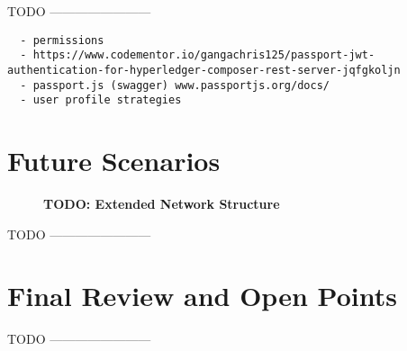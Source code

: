 TODO ------------------------

\begin{verbatim}
  - permissions
  - https://www.codementor.io/gangachris125/passport-jwt-authentication-for-hyperledger-composer-rest-server-jqfgkoljn
  - passport.js (swagger) www.passportjs.org/docs/
  - user profile strategies
\end{verbatim}

\section{Future Scenarios}
\label{sec:future-scene}

\begin{figure}[htbp]
  \centering
  \caption{\bf\small TODO: Extended Network Structure}
  \label{fig:prototype-net-ext}
\end{figure}

TODO ------------------------

\section{Final Review and Open Points}

TODO ------------------------